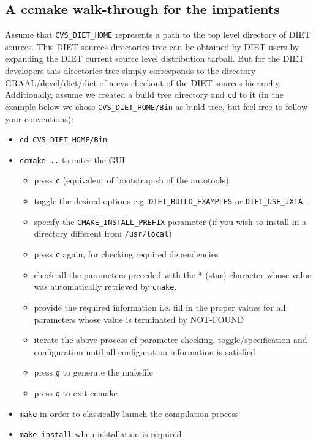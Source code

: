 \subsection{A ccmake walk-through for the impatients}

Assume that \verb+CVS_DIET_HOME+ represents a path to the top level
directory of DIET sources.
This DIET sources directories tree can be obtained by DIET users by
expanding the DIET current source level distribution tarball.
But for the DIET developers this directories tree simply corresponds to
the directory GRAAL/devel/diet/diet of a cvs checkout of the DIET sources
hierarchy.
Additionally, assume we created a build tree directory and \verb+cd+
to it (in the example below we chose \verb+CVS_DIET_HOME/Bin+ as
build tree, but feel free to follow your conventions):
\begin{itemize}
\item
  \verb+cd CVS_DIET_HOME/Bin+
\item
  \verb+ccmake ..+ to enter the GUI
  \begin{itemize}
  \item press \verb+c+ (equivalent of bootstrap.sh of the autotools)
  \item toggle the desired options e.g. \verb+DIET_BUILD_EXAMPLES+ or
     \verb+DIET_USE_JXTA+. 
  \item specify the \verb+CMAKE_INSTALL_PREFIX+ parameter (if you wish
     to install in a directory different from \verb+/usr/local+)
  \item press \verb+c+ again, for checking required dependencies
  \item check all the parameters preceded with the * (star) character
     whose value was automatically retrieved by \verb+cmake+.
  \item provide the required information i.e. fill in the proper values
     for all parameters whose value is terminated by NOT-FOUND
  \item iterate the above process of parameter checking, toggle/specification
     and configuration until all configuration information is satisfied
  \item press \verb+g+ to generate the makefile
  \item press \verb+q+ to exit ccmake
  \end{itemize}
\item
  \verb+make+ in order to classically launch the compilation process
\item
  \verb+make install+ when installation is required
\end{itemize}

